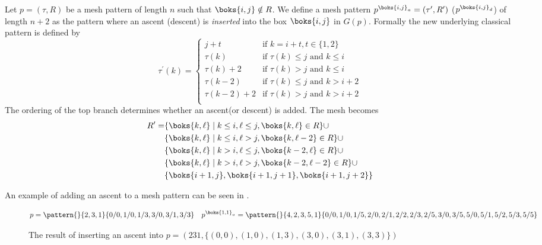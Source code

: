 \begin{definition}
Let \(p=(\tau,R)\) be a mesh pattern of length \(n\) such that \(\boks{i,j}\notin R\). We define
a mesh pattern \(p^{\boks{i,j}_a} = (\tau^\prime,R^\prime)\) (\(p^{\boks{i,j}_d}\)) of length \(n+2\)
as the pattern where an ascent (descent) is \emph{inserted} into the box \(\boks{i,j}\) in \(G(p)\).
Formally the new underlying classical pattern is defined by
\begin{equation*}
\tau^\prime(k) = \begin{cases}
    j+t & \text{if } k = i+t,t\in\{1,2\}\\
    \tau(k) & \text{if } \tau(k)\le j \text{ and }k\le i\\
    \tau(k)+2 & \text{if } \tau(k)> j \text{ and }k\le i\\
    \tau(k-2) & \text{if } \tau(k)\le j \text{ and }k> i+2\\
    \tau(k-2)+2 & \text{if } \tau(k)> j \text{ and }k> i+2\\
\end{cases}
\end{equation*}
The ordering of the top branch determines whether an ascent(or descent) is added.
The mesh becomes
\begin{equation*}
\begin{aligned}
R^\prime=&\{\boks{k,\ell}\mid k\le i, \ell\le j, \boks{k,\ell}\in R\} \cup\\
&\{\boks{k,\ell}\mid k\le i, \ell > j, \boks{k,\ell-2}\in R\}\cup\\
&\{\boks{k,\ell}\mid k > i, \ell \le j, \boks{k-2,\ell}\in R\}\cup\\
&\{\boks{k,\ell}\mid k > i, \ell > j, \boks{k-2,\ell-2}\in R\}\cup\\
&\{\boks{i+1,j},\boks{i+1,j+1},\boks{i+1,j+2}\}
\end{aligned}
\end{equation*}
\end{definition}
An example of adding an ascent to a mesh pattern can be seen in .
\begin{figure}
\begin{equation*}
p = \pattern{}{2,3,1}{0/0,1/0,1/3,
                      3/0,3/1,3/3} \quad
p^{\boks{1,1}_a}= \pattern{}{4,2,3,5,1}{0/0,
                        1/0,1/5,
                        2/0,2/1,2/2,2/3,2/5,
                        3/0,3/5,
                        5/0,5/1,5/2,5/3,5/5}
\end{equation*}
\caption{The result of inserting an ascent into \(p=(231,\{(0,0),(1,0),(1,3),(3,0),(3,1),(3,3)\})\)}
\label{fig:adda}
\end{figure}

